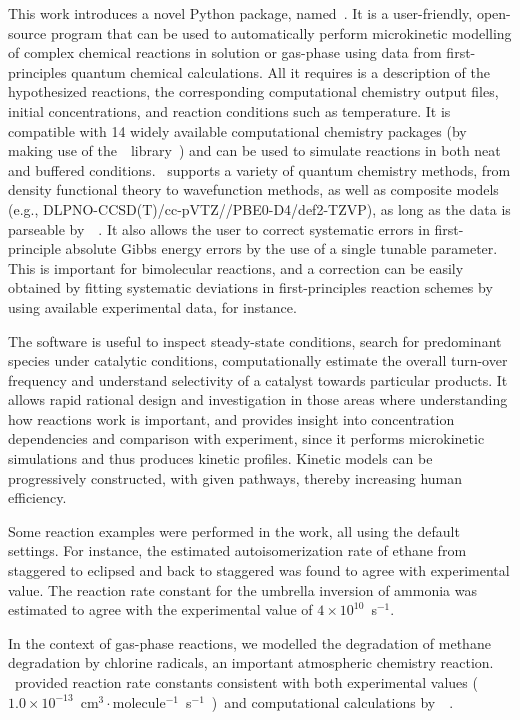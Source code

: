 This work introduces a novel Python package,
named~\overreact{}.
It is a user-friendly,
open-source program that can be used
to automatically perform microkinetic modelling of complex chemical reactions in solution or gas-phase
using data from first-principles quantum chemical calculations.
All it requires is a description of the hypothesized reactions,
the corresponding computational chemistry output files,
initial concentrations,
and reaction conditions such as temperature.
It is compatible with 14 widely available computational chemistry packages
(by making use of the~\cclib{}~library~\cite{O_boyle_2008})
and can be used to simulate reactions in both neat and buffered conditions.
\overreact{}~supports a variety of quantum chemistry methods,
from density functional theory to wavefunction methods,
as well as composite models (e.g.,
DLPNO-CCSD(T)/cc-pVTZ//PBE0-D4/def2-TZVP),
as long as the data is parseable by~\cclib{}~\cite{O_boyle_2008}.
It also allows the user to correct systematic errors in first-principle absolute Gibbs energy errors
by the use of a single tunable parameter.
This is important for bimolecular reactions,
and a correction can be easily obtained by fitting systematic deviations
in first-principles reaction schemes by using available experimental data,
for instance.

The software is useful to inspect steady-state conditions,
search for predominant species under catalytic conditions,
computationally estimate the overall turn-over frequency and understand selectivity of a catalyst towards particular products.
It allows rapid rational design and investigation in those areas where understanding how reactions work is important,
and provides insight into concentration dependencies and comparison with experiment,
since it performs microkinetic simulations
and thus produces kinetic profiles.
Kinetic models can be progressively constructed,
with given pathways,
thereby increasing human efficiency.

Some reaction examples were performed in the work,
all using the default settings.
For instance,
the estimated autoisomerization rate of ethane from staggered to eclipsed
and back to staggered was found to agree with experimental value.
The reaction rate constant for the umbrella inversion of ammonia was estimated to agree
with the experimental value of $4 \times 10^{10}$~s$^{-1}$.

In the context of gas-phase reactions,
we modelled the degradation of methane degradation by chlorine radicals,
an important atmospheric chemistry reaction.
\overreact{}~provided reaction rate constants consistent with both
experimental
values
($1.0 \times 10^{-13}$~cm$^3\cdot{}$molecule$^{-1}$~s$^{-1}$~\cite{Burkholder_2020})~and computational calculations
by~\citeauthor{Tanaka_1996}~\cite{Tanaka_1996}.

